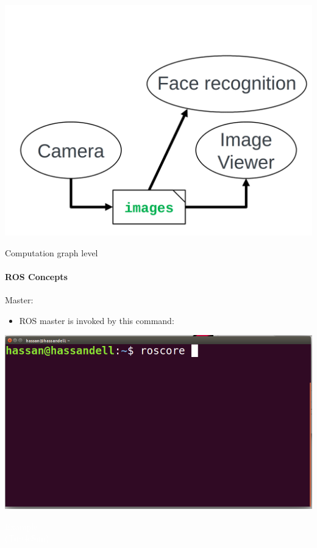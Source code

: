 \documentclass{beamer}
\begin{document}
     \begin{frame}[plain]{}
         \centering
         \includegraphics[width =1.0\linewidth]{figures/master5.png}                                                              
       \end{frame}                             

\begin{frame}{Computation graph level}
    \framesubtitle{ROS Concepts}
    {\huge Master:}
    \vspace{0.2cm}
    \begin{itemize}
        \item ROS master is invoked by this command:
    \end{itemize}
         \centering
         \includegraphics[width =0.75\linewidth]{figures/roscore.png}     
\end{frame}


\begin{frame}[plain]{}  
    \centering
     {\huge \textcolor{white}{Example \\ (TurtleSim)} }
\end{frame}
\end{document}
